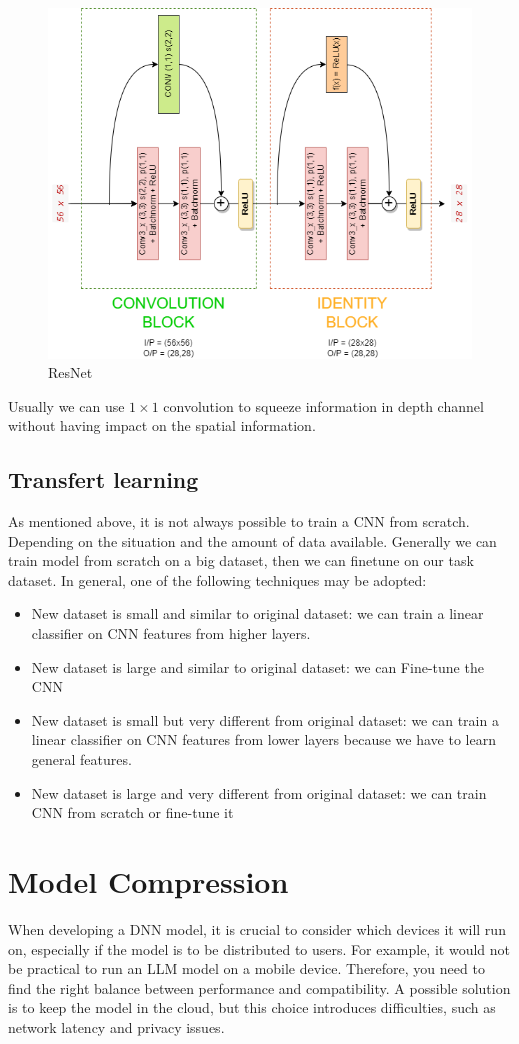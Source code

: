 \begin{itemize}
\begin{figure}[!ht]
              \centering
              \includegraphics[width=0.5\linewidth]{img/CNN/ResNet.png}
              \caption{ResNet}
              \label{fig:enter-label}
          \end{figure}
\end{itemize}
\begin{note}
    Usually we can use $1 \times 1$ convolution to squeeze information in depth channel without
    having impact on the spatial information.
\end{note}

\subsection{Transfert learning}
As mentioned above, it is not always possible to train a CNN from scratch. Depending on
the situation and the amount of data available. Generally we can train model from
scratch on a big dataset, then we can finetune on our task dataset.
In general, one of the following techniques may be adopted:
\begin{itemize}
    \item New dataset is small and similar to original dataset: we can train a linear classifier
          on CNN features from higher layers.
    \item New dataset is large and similar to original dataset: we can Fine-tune the CNN
    \item New dataset is small but very different from original dataset: we can train a linear
          classifier on CNN features from lower layers because we have to learn general
          features.
    \item New dataset is large and very different from original dataset: we can train CNN from
          scratch or fine-tune it
\end{itemize}



\section{Model Compression}
When developing a DNN model, it is crucial to consider which devices it will run on, especially
if the model is to be distributed to users. For example, it would not be practical to run an
LLM model on a mobile device. Therefore, you need to find the right balance between performance
and compatibility. A possible solution is to keep the model in the cloud, but this choice introduces
difficulties, such as network latency and privacy issues.

